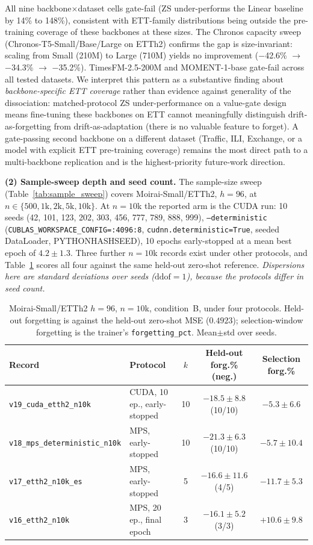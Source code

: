 All nine backbone$\times$dataset cells gate-fail (ZS under-performs
the Linear baseline by 14\% to 148\%), consistent with ETT-family
distributions being outside the pre-training coverage of these
backbones at these sizes.  The Chronos capacity sweep
(Chronos-T5-Small/Base/Large on ETTh2) confirms the gap is
size-invariant: scaling from Small (210M) to Large (710M)
yields no improvement ($-$42.6\% $\to$ $-$34.3\% $\to$ $-$35.2\%).
TimesFM-2.5-200M and MOMENT-1-base gate-fail across all tested datasets.
We interpret this pattern as a substantive finding about
\emph{backbone-specific ETT coverage} rather than evidence against
generality of the dissociation: matched-protocol ZS under-performance
on a value-gate design means fine-tuning these backbones on ETT
cannot meaningfully distinguish drift-as-forgetting from
drift-as-adaptation (there is no valuable feature to forget).  A
gate-passing second backbone on a different dataset (Traffic, ILI,
Exchange, or a model with explicit ETT pre-training coverage)
remains the most direct path to a multi-backbone replication and
is the highest-priority future-work direction.

\textbf{(2) Sample-sweep depth and seed count.}
The sample-size sweep (Table~\ref{tab:sample_sweep}) covers Moirai-Small/ETTh2,
$h{=}96$, at $n \in \{500, 1\text{k}, 2\text{k}, 5\text{k}, 10\text{k}\}$.
At $n{=}10$k the reported arm is the CUDA run: 10 seeds (42, 101, 123, 202, 303,
456, 777, 789, 888, 999), \texttt{--deterministic}
(\texttt{CUBLAS\_WORKSPACE\_CONFIG=:4096:8}, \texttt{cudnn.deterministic=True},
seeded DataLoader, PYTHONHASHSEED), 10 epochs early-stopped at a mean best epoch
of $4.2{\pm}1.3$.  Three further $n{=}10$k records exist under other protocols,
and Table~\ref{tab:n10k_protocols} scores all four against the same held-out
zero-shot reference.  \emph{Dispersions here are standard deviations over seeds
($\text{ddof}{=}1$), because the protocols differ in seed count.}

\begin{table}[!htbp]
\centering\small
\caption{Moirai-Small/ETTh2 $h{=}96$, $n{=}10$k, condition~B, under four
protocols.  Held-out forgetting is against the held-out zero-shot MSE
($0.4923$); selection-window forgetting is the trainer's
\texttt{forgetting\_pct}.  Mean${\pm}$std over seeds.}
\label{tab:n10k_protocols}
\begin{tabular}{@{}llccc@{}}
\toprule
Record & Protocol & $k$ & Held-out forg.\% (neg.) & Selection forg.\% \\
\midrule
\texttt{v19\_cuda\_etth2\_n10k} & CUDA, 10 ep., early-stopped & 10 & $-18.5{\pm}8.8$ (10/10) & $-5.3{\pm}6.6$ \\
\texttt{v18\_mps\_deterministic\_n10k} & MPS, early-stopped & 10 & $-21.3{\pm}6.3$ (10/10) & $-5.7{\pm}10.4$ \\
\texttt{v17\_etth2\_n10k\_es} & MPS, early-stopped & 5 & $-16.6{\pm}11.6$ (4/5) & $-11.7{\pm}5.3$ \\
\texttt{v16\_etth2\_n10k} & MPS, 20 ep., final epoch & 3 & $-16.1{\pm}5.2$ (3/3) & $+10.6{\pm}9.8$ \\
\bottomrule
\end{tabular}
\end{table}

